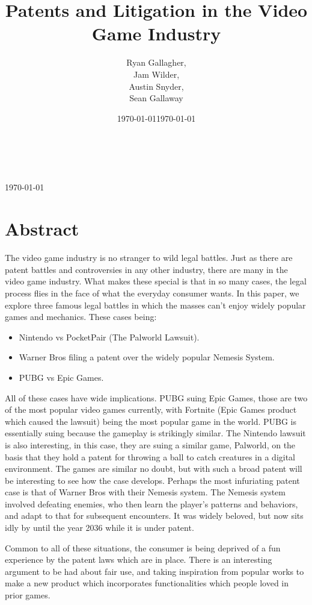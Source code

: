 \documentclass[12pt,letterpaper]{article}
\title{Patents and Litigation in the Video Game Industry}
\author{Ryan Gallagher,
\\ Jam Wilder,
\\ Austin Snyder,
\\ Sean Gallaway}
\date{\today}
\makeatletter
\renewcommand{\maketitle}{\bgroup
   \begin{center}
   \textbf{{\fontsize{18pt}{20}\selectfont \@title}}\\
   \vspace{10pt}
   {\fontsize{12pt}{0}\selectfont \@author}
   \\ \today

   \end{center}
\egroup}
\makeatother
\begin{document}
\date{\today}
\maketitle
\thispagestyle{fancy}

\pagebreak

\section{Abstract}
The video game industry is no stranger to wild legal battles. Just as there are patent battles and controversies in any other industry, there are many in the video game industry. What makes these special is that in so many cases, the legal process flies in the face of what the everyday consumer wants. In this paper, we explore three famous legal battles in which the masses can't enjoy widely popular games and mechanics. These cases being:
\begin{itemize}
    \item Nintendo vs PocketPair (The Palworld Lawsuit).
    \item Warner Bros filing a patent over the widely popular Nemesis System.
    \item PUBG vs Epic Games.
\end{itemize}
\par All of these cases have wide implications. PUBG suing Epic Games, those are two of the most popular video games currently, with Fortnite (Epic Games product which caused the lawsuit) being the most popular game in the world. PUBG is essentially suing because the gameplay is strikingly similar. The Nintendo lawsuit is also interesting, in this case, they are suing a similar game, Palworld, on the basis that they hold a patent for throwing a ball to catch creatures in a digital environment. The games are similar no doubt, but with such a broad patent will be interesting to see how the case develops. Perhaps the most infuriating patent case is that of Warner Bros with their Nemesis system. The Nemesis system involved defeating enemies, who then learn the player's patterns and behaviors, and adapt to that for subsequent encounters. It was widely beloved, but now sits idly by until the year 2036 while it is under patent.
\par Common to all of these situations, the consumer is being deprived of a fun experience by the patent laws which are in place. There is an interesting argument to be had about fair use, and taking inspiration from popular works to make a new product which incorporates functionalities which people loved in prior games.
\end{document}
